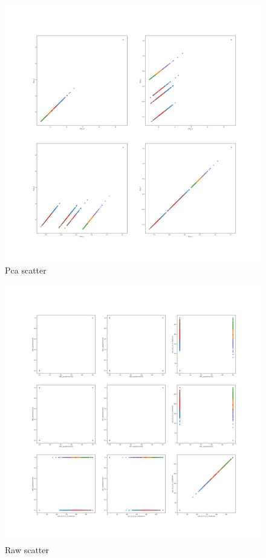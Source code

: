 \documentclass{article}
\begin{document}
\begin{figure}[H]
    \centering
    \includegraphics[width=1\columnwidth]{Crystal/feedback_logtransform_zNonepca2k6/PCA Scatter.png}
    \caption{Pca scatter}
    \label{fig:Crystalfeedbackpcascatter}
\end{figure}
\begin{figure}[H]
    \centering
    \includegraphics[width=1\columnwidth]{Crystal/feedback_logtransform_zNonepca2k6/Raw Scatter.png}
    \caption{Raw scatter}
    \label{fig:Crystalfeedbackrawscatter}
\end{figure}
\end{document}
